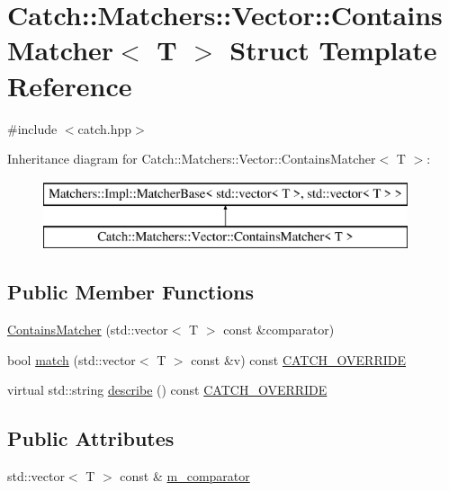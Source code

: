 \hypertarget{structCatch_1_1Matchers_1_1Vector_1_1ContainsMatcher}{\section{Catch\-:\-:Matchers\-:\-:Vector\-:\-:Contains\-Matcher$<$ T $>$ Struct Template Reference}
\label{structCatch_1_1Matchers_1_1Vector_1_1ContainsMatcher}
}


{\ttfamily \#include $<$catch.\-hpp$>$}

Inheritance diagram for Catch\-:\-:Matchers\-:\-:Vector\-:\-:Contains\-Matcher$<$ T $>$\-:\begin{figure}[H]
\begin{center}
\leavevmode
\includegraphics[height=2.000000cm]{structCatch_1_1Matchers_1_1Vector_1_1ContainsMatcher}
\end{center}
\end{figure}
\subsection*{Public Member Functions}
\begin{DoxyCompactItemize}
\item 
\hyperlink{structCatch_1_1Matchers_1_1Vector_1_1ContainsMatcher_ad8e92c8399be6dce75bb5702cdfab700}{Contains\-Matcher} (std\-::vector$<$ T $>$ const \&comparator)
\item 
bool \hyperlink{structCatch_1_1Matchers_1_1Vector_1_1ContainsMatcher_aba81516816a6796124dd4fe4843e7284}{match} (std\-::vector$<$ T $>$ const \&v) const \hyperlink{catch_8hpp_a8ecdce4d3f57835f707915ae831eb847}{C\-A\-T\-C\-H\-\_\-\-O\-V\-E\-R\-R\-I\-D\-E}
\item 
virtual std\-::string \hyperlink{structCatch_1_1Matchers_1_1Vector_1_1ContainsMatcher_add1a31f049cec89f980424ecdb7027ac}{describe} () const \hyperlink{catch_8hpp_a8ecdce4d3f57835f707915ae831eb847}{C\-A\-T\-C\-H\-\_\-\-O\-V\-E\-R\-R\-I\-D\-E}
\end{DoxyCompactItemize}
\subsection*{Public Attributes}
\begin{DoxyCompactItemize}
\item 
std\-::vector$<$ T $>$ const \& \hyperlink{structCatch_1_1Matchers_1_1Vector_1_1ContainsMatcher_a83d051166e4ed0d535219ad6ee99abb2}{m\-\_\-comparator}
\end{DoxyCompactItemize}


